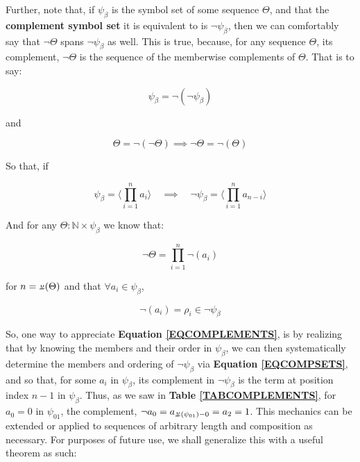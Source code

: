 \documentclass[a4paper, 18pt]{book} %
\newcommand{\invpi}{\rotatebox[origin=c]{180}{$\pi$}}
\begin{document}
Further, note that, if $\psi_\beta$ is the symbol set of some sequence $\Theta$, and that the \textbf{complement symbol set} it is equivalent to is $\lnot\psi_\beta$, then we can comfortably say that $\lnot\Theta$ spans $\lnot\psi_\beta$ as well. This is true, because, for any sequence $\Theta$, its complement, $\lnot\Theta$ is the sequence of the memberwise complements of $\Theta$. That is to say:

\begin{equation}
\psi_\beta = \lnot (\lnot \psi_\beta)
\end{equation}

and 

\begin{equation}
\Theta = \lnot(\lnot\Theta) \implies \lnot\Theta = \lnot(\Theta)
\end{equation}

So that, if

\begin{equation}
\label{EQCOMPSETS}
\psi_\beta = \langle \prod\limits_{i=1}^{n} a_i \rangle \quad \implies \quad \lnot\psi_\beta = \langle \prod\limits_{i=1}^{n} a_{n-i} \rangle
\end{equation}

And for any $\Theta: \mathbb{N} \times \psi_\beta$ we know that:

\begin{equation}
\lnot\Theta = \prod\limits_{i=1}^{n} \lnot(a_i)
\end{equation}

for $n = \invpi(\Theta)$ and that $\forall a_i \in \psi_\beta$, 

\begin{equation}
\label{EQCOMPLEMENTS}
\lnot(a_i) = \rho_i \in \lnot\psi_\beta
\end{equation}


So, one way to appreciate \textbf{Equation \ref{EQCOMPLEMENTS}}, is by realizing that by knowing the members and their order in $\psi_\beta$, we can then systematically determine the members and ordering of $\lnot\psi_\beta$ via \textbf{Equation \ref{EQCOMPSETS}}, and so that, for some $a_i$ in $\psi_\beta$, its complement in $\lnot\psi_\beta$ is the term at position index $n-1$ in $\psi_\beta$. Thus, as we saw in \textbf{Table \ref{TABCOMPLEMENTS}}, for $a_0 = 0$ in $\psi_{01}$, the complement, $\lnot a_0 = a_{\invpi(\psi_{01})-0} = a_2 = 1$. This mechanics can be extended or applied to sequences of arbitrary length and composition as necessary. For purposes of future use, we shall generalize this with a useful theorem as such:
\end{document}
